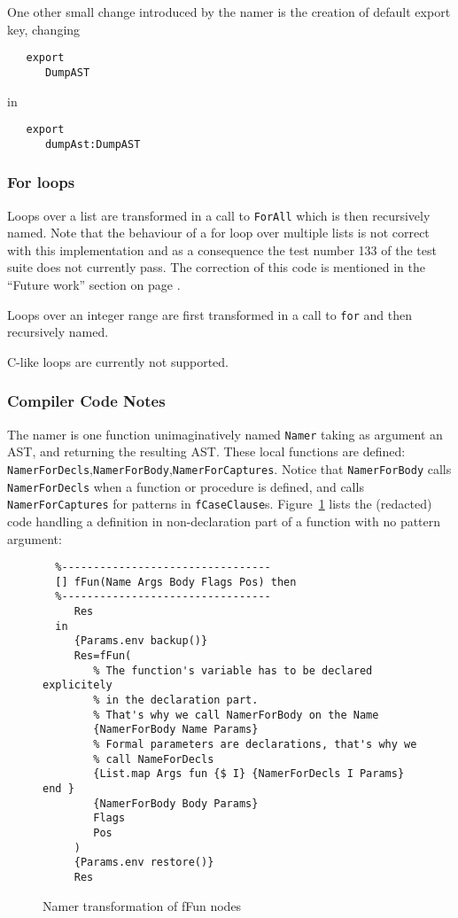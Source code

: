 \documentclass[a4paper]{memoir}
\begin{document}
One other small change introduced by the namer is the creation of default export
key, changing
\begin{lstlisting}
   export
      DumpAST
\end{lstlisting}
in
\begin{lstlisting}
   export
      dumpAst:DumpAST
\end{lstlisting}




\subsubsection{For loops}
Loops over a list are transformed in a call to \lstinline!ForAll! which is then
recursively named. Note that the behaviour of a for loop over multiple lists is not correct with this implementation and
as a consequence the test number 133 of the test suite does not currently pass. The correction of this code is mentioned in the ``Future work'' section on page \pageref{sec:futurework}.

Loops over an integer range are first transformed in a call
to \lstinline!for! and then recursively named.

C-like loops are currently not supported.

\subsubsection{Compiler Code Notes}
The namer is one function unimaginatively named \lstinline!Namer! taking as argument an AST, and returning the resulting AST.
These local functions are defined: \lstinline!NamerForDecls!,\lstinline!NamerForBody!,\lstinline!NamerForCaptures!.
Notice that \lstinline!NamerForBody! calls \lstinline!NamerForDecls! when a function or procedure is
defined, and calls \lstinline!NamerForCaptures! for patterns in \lstinline!fCaseClause!s. 
Figure~\ref{fig:namer:ffun} lists the (redacted) code handling a definition in non-declaration part of a
function with no pattern argument:

\begin{figure}[h]
\begin{lstlisting}
  %---------------------------------
  [] fFun(Name Args Body Flags Pos) then
  %---------------------------------
     Res
  in
     {Params.env backup()} 
     Res=fFun(
        % The function's variable has to be declared explicitely 
        % in the declaration part.
        % That's why we call NamerForBody on the Name
        {NamerForBody Name Params}
        % Formal parameters are declarations, that's why we 
        % call NameForDecls
        {List.map Args fun {$ I} {NamerForDecls I Params} end }
        {NamerForBody Body Params}
        Flags
        Pos
     )
     {Params.env restore()}
     Res
\end{lstlisting}
\caption{Namer transformation of fFun nodes}
\label{fig:namer:ffun}
\end{figure}
\end{document}
